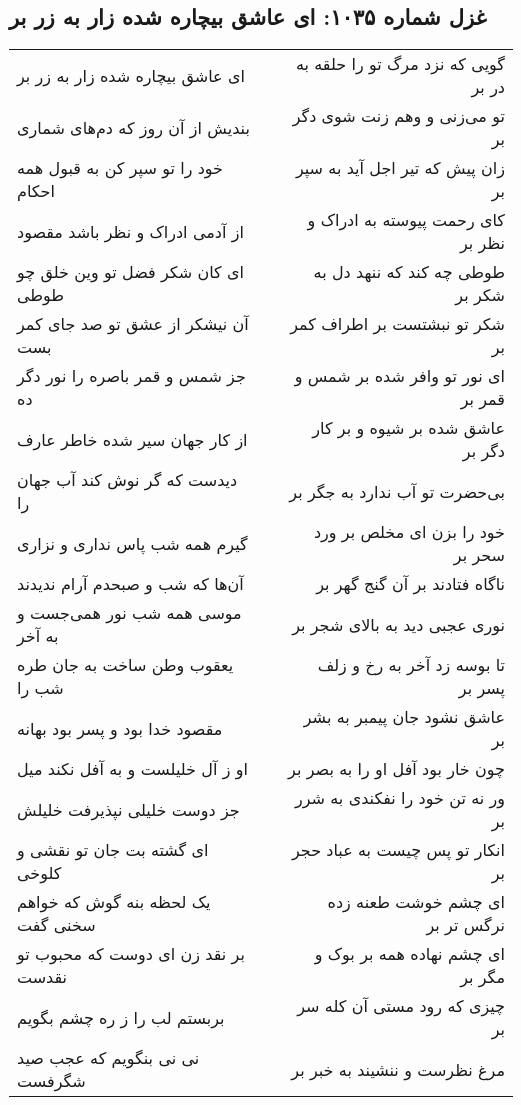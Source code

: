\begin{center}
\section*{غزل شماره ۱۰۳۵: ای عاشق بیچاره شده زار به زر بر}
\label{sec:1035}
\begin{longtable}{l p{0.5cm} r}
ای عاشق بیچاره شده زار به زر بر
&&
گویی که نزد مرگ تو را حلقه به در بر
\\
بندیش از آن روز که دم‌های شماری
&&
تو می‌زنی و وهم زنت شوی دگر بر
\\
خود را تو سپر کن به قبول همه احکام
&&
زان پیش که تیر اجل آید به سپر بر
\\
از آدمی ادراک و نظر باشد مقصود
&&
کای رحمت پیوسته به ادراک و نظر بر
\\
ای کان شکر فضل تو وین خلق چو طوطی
&&
طوطی چه کند که ننهد دل به شکر بر
\\
آن نیشکر از عشق تو صد جای کمر بست
&&
شکر تو نبشتست بر اطراف کمر بر
\\
جز شمس و قمر باصره را نور دگر ده
&&
ای نور تو وافر شده بر شمس و قمر بر
\\
از کار جهان سیر شده خاطر عارف
&&
عاشق شده بر شیوه و بر کار دگر بر
\\
دیدست که گر نوش کند آب جهان را
&&
بی‌حضرت تو آب ندارد به جگر بر
\\
گیرم همه شب پاس نداری و نزاری
&&
خود را بزن ای مخلص بر ورد سحر بر
\\
آن‌ها که شب و صبحدم آرام ندیدند
&&
ناگاه فتادند بر آن گنج گهر بر
\\
موسی همه شب نور همی‌جست و به آخر
&&
نوری عجبی دید به بالای شجر بر
\\
یعقوب وطن ساخت به جان طره شب را
&&
تا بوسه زد آخر به رخ و زلف پسر بر
\\
مقصود خدا بود و پسر بود بهانه
&&
عاشق نشود جان پیمبر به بشر بر
\\
او ز آل خلیلست و به آفل نکند میل
&&
چون خار بود آفل او را به بصر بر
\\
جز دوست خلیلی نپذیرفت خلیلش
&&
ور نه تن خود را نفکندی به شرر بر
\\
ای گشته بت جان تو نقشی و کلوخی
&&
انکار تو پس چیست به عباد حجر بر
\\
یک لحظه بنه گوش که خواهم سخنی گفت
&&
ای چشم خوشت طعنه زده نرگس تر بر
\\
بر نقد زن ای دوست که محبوب تو نقدست
&&
ای چشم نهاده همه بر بوک و مگر بر
\\
بربستم لب را ز ره چشم بگویم
&&
چیزی که رود مستی آن کله سر بر
\\
نی نی بنگویم که عجب صید شگرفست
&&
مرغ نظرست و ننشیند به خبر بر
\\
\end{longtable}
\end{center}
